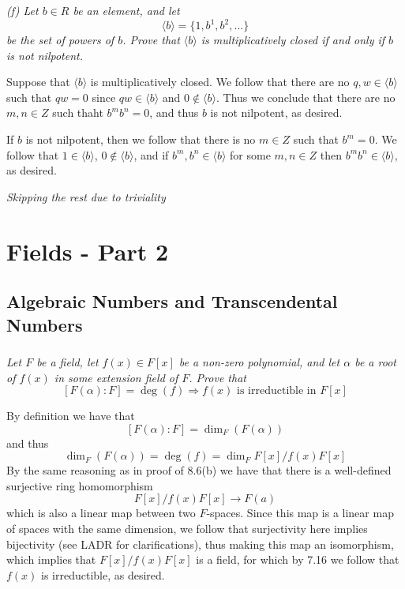 \documentclass[11pt,oneside,titlepage]{book}
\DeclareMathOperator \ra {\Rightarrow}
\newcommand{\eangle}[1]{\langle #1 \rangle}
\newcommand{\set}[1]{\{ #1 \}}
\begin{document}
\textit{(f) Let $b \in R$ be an element, and let
  $$\eangle{b} = \set{1, b^1, b^2, ...}$$
  be the set of powers of $b$. Prove that $\eangle{b}$ is multiplicatively
  closed if and only if $b$ is not nilpotent.}

Suppose that $\eangle{b}$ is multiplicatively closed. We follow that
there are no $q, w \in \eangle{b}$ such that $qw = 0$ since $qw \in
\eangle{b}$ and $0 \notin \eangle{b}$. Thus we conclude that there
are no $m, n \in Z$ such thaht $b^m b^n = 0$, and thus $b$
is not nilpotent, as desired.

If $b$ is not nilpotent, then we follow that there is no $m \in Z$
such that $b^m = 0$. We follow that $1 \in \eangle{b}$,
$0 \notin \eangle{b}$, and if $b^m, b^n \in \eangle{b}$ for some
$m, n \in Z$ then $b^mb^n \in \eangle{b}$, as desired.

\textit{Skipping the rest due to triviality}

\chapter{Fields - Part 2}

\section{Algebraic Numbers and Transcendental Numbers}

\subsection{}

\textit{Let $F$ be a field, let $f(x) \in F[x]$ be a non-zero
  polynomial, and let $\alpha$ be a root of $f(x)$ in some extension
  field of $F$. Prove that
  $$[F(\alpha):F] = \deg(f) \ra f(x) \text{ is irreductible in } F[x]$$
}

By definition we have that
$$[F(\alpha):F] = \dim_F(F(\alpha))$$
and thus
$$\dim_F(F(\alpha)) = \deg(f) = \dim_F F[x]/f(x)F[x]$$
By the same reasoning as in proof of 8.6(b) we have that there is a
well-defined surjective ring homomorphism
$$F[x]/f(x)F[x] \to F(a)$$
which is also a linear map between two $F$-spaces.
Since this map is a linear map of spaces with the same dimension,
we follow that surjectivity here implies bijectivity (see LADR for
clarifications), thus making this map an isomorphism, which implies that
$F[x]/f(x)F[x]$ is a field, for which by 7.16 we follow that $f(x)$
is irreductible, as desired.

\subsection{}
\end{document}
